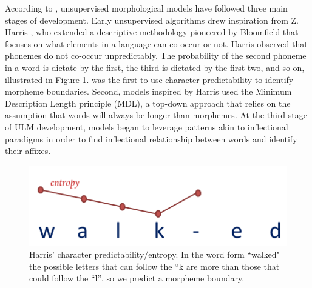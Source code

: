 \documentclass[12pt]{article}
\begin{document}
According to , unsupervised morphological models have followed three main stages of development. Early unsupervised algorithms drew inspiration from Z. Harris \cite{harris_phoneme_1955,harris_morpheme_1967}, who extended a descriptive methodology pioneered by Bloomfield that focuses on what elements in a language can co-occur or not. Harris observed that phonemes do not co-occur unpredictably. The probability of the second phoneme in a word is dictate by the first, the third is dictated by the first two, and so on, illustrated in Figure \ref{fig:harris}.  was the first to use character predictability to identify morpheme boundaries. Second, models inspired by Harris used the Minimum Description Length principle (MDL), a top-down approach that relies on the assumption that words will always be longer than morphemes.  At the third stage of ULM development, models began to leverage patterns akin to inflectional paradigms in order to find inflectional relationship between words and identify their affixes.

\begin{figure}[ht]
\label{fig:harris}
\begin{center}
\includegraphics[width=0.5\columnwidth]{Harris-Entropy-image.PNG}
\caption{Harris' character predictability/entropy. In the word form ``walked" the possible letters that can follow the ``k are more than those that could follow the ``l'', so we predict a morpheme boundary.}
\end{center}
\end{figure}
\end{document}
